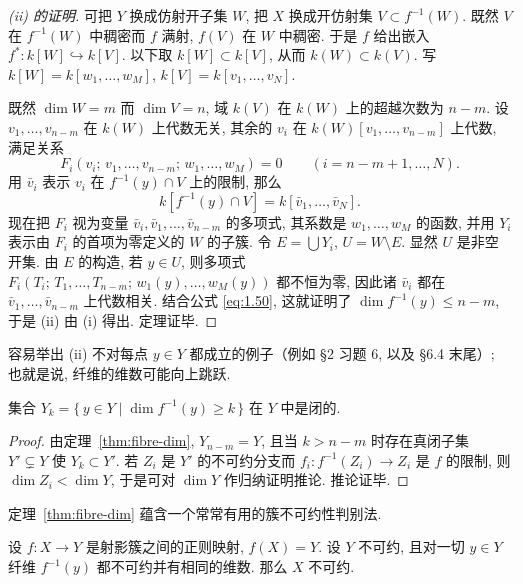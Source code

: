 \begin{proof}[(ii) 的证明]
	可把 $Y$ 换成仿射开子集 $W$, 把 $X$ 换成开仿射集 $V \subset f^{-1}(W)$. 既然 $V$ 在 $f^{-1}(W)$ 中稠密而 $f$ 满射, $f(V)$ 在 $W$ 中稠密. 于是 $f$ 给出嵌入 $f^*: k[W] \hookrightarrow k[V]$. 以下取 $k[W] \subset k[V]$, 从而 $k(W) \subset k(V)$. 写 $k[W] = k[w_1, \ldots, w_M]$, $k[V] = k[v_1, \ldots, v_N]$.

	既然 $\dim W = m$ 而 $\dim V = n$, 域 $k(V)$ 在 $k(W)$ 上的超越次数为 $n - m$. 设 $v_1, \ldots, v_{n-m}$ 在 $k(W)$ 上代数无关, 其余的 $v_i$ 在 $k(W)[v_1, \ldots, v_{n-m}]$ 上代数, 满足关系
	\[
		F_i(v_i;\, v_1, \ldots, v_{n-m};\, w_1, \ldots, w_M) = 0 \qquad (i = n-m+1, \ldots, N).
	\]
	用 $\bar v_i$ 表示 $v_i$ 在 $f^{-1}(y) \cap V$ 上的限制, 那么
	\begin{equation}
		\label{eq:1.50}
		k[f^{-1}(y) \cap V] = k[\bar v_1, \ldots, \bar v_N].
	\end{equation}
	现在把 $F_i$ 视为变量 $\bar v_i, \bar v_1, \ldots, \bar v_{n-m}$ 的多项式, 其系数是 $w_1, \ldots, w_M$ 的函数, 并用 $Y_i$ 表示由 $F_i$ 的首项为零定义的 $W$ 的子簇. 令 $E = \bigcup Y_i$, $U = W \setminus E$. 显然 $U$ 是非空开集. 由 $E$ 的构造, 若 $y \in U$, 则多项式 $F_i(T_i;\, T_1, \ldots, T_{n-m};\, w_1(y), \ldots, w_M(y))$ 都不恒为零, 因此诸 $\bar v_i$ 都在 $\bar v_1, \ldots, \bar v_{n-m}$ 上代数相关. 结合公式 \eqref{eq:1.50}, 这就证明了 $\dim f^{-1}(y) \le n - m$, 于是 (ii) 由 (i) 得出. 定理证毕.
\end{proof}

容易举出 (ii) 不对每点 $y \in Y$ 都成立的例子（例如 §2 习题 6, 以及 §6.4 末尾）; 也就是说, 纤维的维数可能向上跳跃.

\begin{corollary}\label{cor:fibre-closed}
	集合 $Y_k = \{\, y \in Y \mid \dim f^{-1}(y) \ge k \,\}$ 在 $Y$ 中是闭的.
\end{corollary}

\begin{proof}
	由定理~\ref{thm:fibre-dim}, $Y_{n-m} = Y$, 且当 $k > n-m$ 时存在真闭子集 $Y' \subsetneq Y$ 使 $Y_k \subset Y'$. 若 $Z_i$ 是 $Y'$ 的不可约分支而 $f_i: f^{-1}(Z_i) \to Z_i$ 是 $f$ 的限制, 则 $\dim Z_i < \dim Y$, 于是可对 $\dim Y$ 作归纳证明推论. 推论证毕.
\end{proof}

定理~\ref{thm:fibre-dim} 蕴含一个常常有用的簇不可约性判别法.

\begin{theorem}\label{thm:irreducibility-criterion}
	设 $f: X \to Y$ 是射影簇之间的正则映射, $f(X) = Y$. 设 $Y$ 不可约, 且对一切 $y \in Y$ 纤维 $f^{-1}(y)$ 都不可约并有相同的维数. 那么 $X$ 不可约.
\end{theorem}

